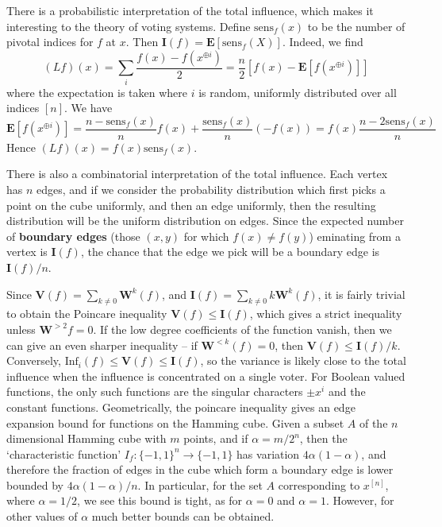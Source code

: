 There is a probabilistic interpretation of the total influence, which makes it interesting to the theory of voting systems. Define $\text{sens}_f(x)$ to be the number of pivotal indices for $f$ at $x$. Then $\mathbf{I}(f) = \mathbf{E}[\text{sens}_f(X)]$. Indeed, we find
%
\[ (Lf)(x) = \sum_i \frac{f(x) - f(x^{\oplus i})}{2} = \frac{n}{2} [f(x) - \mathbf{E}[f(x^{\oplus i})]] \]
%
where the expectation is taken where $i$ is random, uniformly distributed over all indices $[n]$. We have
%
\[ \mathbf{E}[f(x^{\oplus i})] = \frac{n - \text{sens}_f(x)}{n} f(x) + \frac{\text{sens}_f(x)}{n} (-f(x)) = f(x) \frac{n - 2 \text{sens}_f(x)}{n} \]
%
Hence $(Lf)(x) = f(x) \text{sens}_f(x)$.

There is also a combinatorial interpretation of the total influence. Each vertex has $n$ edges, and if we consider the probability distribution which first picks a point on the cube uniformly, and then an edge uniformly, then the resulting distribution will be the uniform distribution on edges. Since the expected number of {\bf boundary edges} (those $(x,y)$ for which $f(x) \neq f(y)$) eminating from a vertex is $\mathbf{I}(f)$, the chance that the edge we pick will be a boundary edge is $\mathbf{I}(f)/n$.

Since $\mathbf{V}(f) = \sum_{k \neq 0} \mathbf{W}^k(f)$, and $\mathbf{I}(f) = \sum_{k \neq 0} k\mathbf{W}^k(f)$, it is fairly trivial to obtain the Poincare inequality $\mathbf{V}(f) \leq \mathbf{I}(f)$, which gives a strict inequality unless $\mathbf{W}^{> 2}f = 0$. If the low degree coefficients of the function vanish, then we can give an even sharper inequality -- if $\mathbf{W}^{< k}(f) = 0$, then $\mathbf{V}(f) \leq \mathbf{I}(f)/k$. Conversely, $\text{Inf}_i(f) \leq \mathbf{V}(f) \leq \mathbf{I}(f)$, so the variance is likely close to the total influence when the influence is concentrated on a single voter. For Boolean valued functions, the only such functions are the singular characters $\pm x^i$ and the constant functions. Geometrically, the poincare inequality gives an edge expansion bound for functions on the Hamming cube. Given a subset $A$ of the $n$ dimensional Hamming cube with $m$ points, and if $\alpha = m/2^n$, then the `characteristic function' $I_f: \{ -1, 1 \}^n \to \{ -1, 1 \}$ has variation $4 \alpha (1 - \alpha)$, and therefore the fraction of edges in the cube which form a boundary edge is lower bounded by $4\alpha(1-\alpha)/n$. In particular, for the set $A$ corresponding to $x^{[n]}$, where $\alpha = 1/2$, we see this bound is tight, as for $\alpha = 0$ and $\alpha = 1$. However, for other values of $\alpha$ much better bounds can be obtained.

